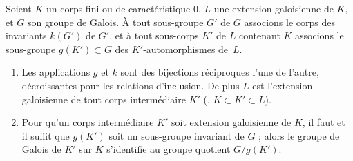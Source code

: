 \documentclass[11pt, useosf,
  title in boldface,
  theorem in new line,
  theorem numbering = section,
  number theorems separately,
]{simplivre}
\begin{document}
    \begin{theorem}\label{thm:correspondance de Galois}
        Soient \( K \) un corps fini ou de caractéristique \( 0 \), \( L \) une extension galoisienne de \( K \), et \( G \) son groupe de Galois. À tout sous-groupe \( G' \) de \( G \) associons le corps des invariants \( k(G') \) de \( G' \), et à tout sous-corps \( K' \) de \( L \) contenant \( K \) associons le sous-groupe \( g(K') \subset G \) des \( K' \)‑automorphismes de~\( L \).
        \begin{enumerate}
            \item \label{thm:correspondance de Galois;item1} Les applications \( g \) et \( k \) sont des bijections réciproques l'une de l'autre, décroissantes pour les relations d'inclusion. De plus \( L \) est l'extension galoisienne de tout corps intermédiaire \( K' \) (\ie. \( K \subset K' \subset L \)).
            \item \label{thm:correspondance de Galois;item2} Pour qu'un corps intermédiaire \( K' \) soit extension galoisienne de \( K \), il faut et il suffit que \( g(K') \) soit un sous-groupe invariant de \( G \) ; alors le groupe de Galois de \( K' \) sur \( K \) s'identifie au groupe quotient \( G/g(K') \).
        \end{enumerate}
    \end{theorem}
\end{document}
